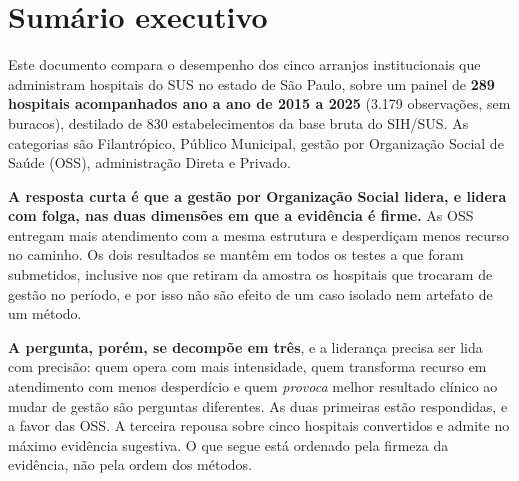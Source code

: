 %
\section*{Sumário executivo}
\label{sec:resumo}

\noindent Este documento compara o desempenho dos cinco arranjos
institucionais que administram hospitais do SUS no estado de São Paulo,
sobre um painel de \textbf{289 hospitais acompanhados ano a ano de 2015 a
2025} (3.179 observações, sem buracos), destilado de 830 estabelecimentos
da base bruta do SIH/SUS. As categorias são Filantrópico, Público
Municipal, gestão por Organização Social de Saúde (OSS), administração
Direta e Privado.

\medskip
\noindent\textbf{A resposta curta é que a gestão por Organização Social
lidera, e lidera com folga, nas duas dimensões em que a evidência é
firme.} As OSS entregam mais atendimento com a mesma estrutura e
desperdiçam menos recurso no caminho. Os dois resultados se mantêm em
todos os testes a que foram submetidos, inclusive nos que retiram da
amostra os hospitais que trocaram de gestão no período, e por isso não
são efeito de um caso isolado nem artefato de um método.

\medskip
\noindent\textbf{A pergunta, porém, se decompõe em três}, e a liderança
precisa ser lida com precisão: quem opera com mais intensidade, quem
transforma recurso em atendimento com menos desperdício e quem
\emph{provoca} melhor resultado clínico ao mudar de gestão são perguntas
diferentes. As duas primeiras estão respondidas, e a favor das OSS. A
terceira repousa sobre cinco hospitais convertidos e admite no máximo
evidência sugestiva. O que segue está ordenado pela firmeza da evidência,
não pela ordem dos métodos.


